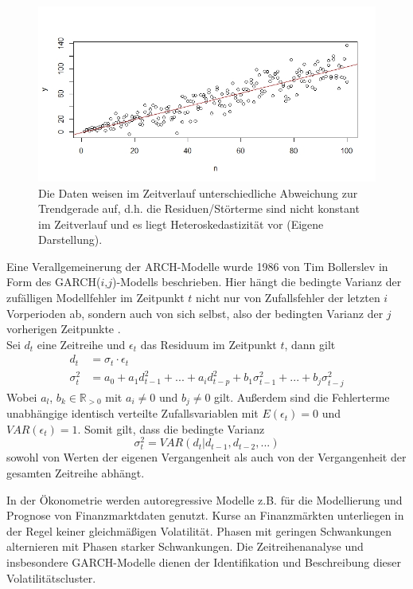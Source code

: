 \documentclass[ngerman]{ttlab-qualify}
\begin{document}
\begin{figure}[]
\begin{center}
\includegraphics[scale=.6]{images/heteroscedasticity-own-ref}
\caption{Die Daten weisen im Zeitverlauf unterschiedliche Abweichung zur Trendgerade auf, d.h. die Residuen/Störterme sind nicht konstant im Zeitverlauf und es liegt Heteroskedastizität vor (Eigene Darstellung).}
\label{fig:heteroscedasticity}
\end{center}
\end{figure}

Eine Verallgemeinerung der ARCH-Modelle wurde 1986 von Tim Bollerslev in Form des GARCH($i$,$j$)-Modells beschrieben. Hier hängt die bedingte Varianz der zufälligen Modellfehler im Zeitpunkt $t$ nicht nur von Zufallsfehler der letzten $i$ Vorperioden ab, sondern auch von sich selbst, also der bedingten Varianz der $j$ vorherigen Zeitpunkte \parencite{bollerslev:1986}.\\
Sei $d_t$ eine Zeitreihe und $\epsilon_t$ das Residuum im Zeitpunkt $t$, dann gilt
\begin{align}
d_t&= \sigma_t\cdot \epsilon_t \nonumber \\
\sigma_t^2 &= a_0 + a_1d_{t-1}^2 + ... + a_id_{t-p}^2+b_1\sigma_{t-1}^2+ ... +b_j\sigma_{t-j}^2
\end{align} 
Wobei $a_l$, $b_k \in \mathbb{R}_{>0}$ mit  $a_i \neq 0$ und $b_j\neq 0$ gilt. Außerdem sind die Fehlerterme unabhängige identisch verteilte Zufallsvariablen mit $E(\epsilon_t)=0$ und $VAR(\epsilon_t)=1$. 
Somit gilt, dass die bedingte Varianz 
\[\sigma_t^2 = VAR(d_t|d_{t-1},d_{t-2},...)\]
sowohl von Werten der eigenen Vergangenheit als auch von der Vergangenheit der gesamten Zeitreihe abhängt.

In der Ökonometrie werden autoregressive Modelle z.B. für die Modellierung und Prognose von Finanzmarktdaten genutzt. Kurse an Finanzmärkten unterliegen in der Regel keiner gleichmäßigen Volatilität. Phasen mit geringen Schwankungen alternieren mit Phasen starker Schwankungen. Die Zeitreihenanalyse und insbesondere GARCH-Modelle dienen der Identifikation und Beschreibung dieser Volatilitätscluster. 
\end{document}
